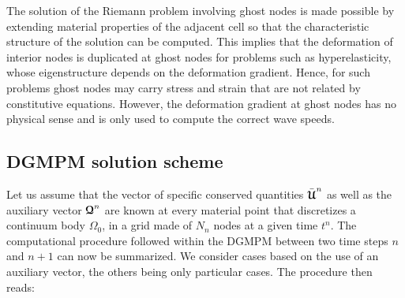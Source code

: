 \begin{remark}
  \label{rq:BC_ghostnode}
  The solution of the Riemann problem involving ghost nodes is made possible by extending material properties of the adjacent cell so that the characteristic structure of the solution can be computed.
  This implies that the deformation of interior nodes is duplicated at ghost nodes for problems such as hyperelasticity, whose eigenstructure depends on the deformation gradient.
  Hence, for such problems ghost nodes may carry stress and strain that are not related by constitutive equations.
  However, the deformation gradient at ghost nodes has no physical sense and is only used to compute the correct wave speeds.
\end{remark}

\subsection{DGMPM solution scheme}
Let us assume that the vector of specific conserved quantities $\bar{{\boldsymbol{\mathcal{U}}}}^n$ as well as the auxiliary vector ${\boldsymbol{\mathcal{Q}}}^n$ are known at every material point that discretizes a continuum body $\Omega_0$, in a grid made of $N_{n}$ nodes at a given time $t^n$.
The computational procedure followed within the DGMPM between two time steps $n$ and $n+1$ can now be summarized.
We consider cases based on the use of an auxiliary vector, the others being only particular cases.
The procedure then reads:
